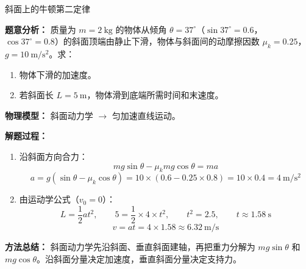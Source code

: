 \begin{examplebox}{斜面上的牛顿第二定律}

\textbf{题意分析：} 质量为 $m = 2\ \mathrm{kg}$ 的物体从倾角 $\theta = 37^\circ$（$\sin37^\circ = 0.6$，$\cos37^\circ = 0.8$）的斜面顶端由静止下滑，物体与斜面间的动摩擦因数 $\mu_k = 0.25$，$g = 10\ \mathrm{m/s^2}$。求：
\begin{enumerate}
  \item 物体下滑的加速度。
  \item 若斜面长 $L = 5\ \mathrm{m}$，物体滑到底端所需时间和末速度。
\end{enumerate}

\textbf{物理模型：} 斜面动力学 $\to$ 匀加速直线运动。

\begin{center}


\label{fig:example-newton-incline}
\end{center}

\textbf{解题过程：}

\begin{enumerate}
  \item 沿斜面方向合力：
  \[
  mg\sin\theta - \mu_k mg\cos\theta = ma
  \]
  \[
  a = g(\sin\theta - \mu_k\cos\theta) = 10 \times (0.6 - 0.25 \times 0.8) = 10 \times 0.4 = 4\ \mathrm{m/s^2}
  \]

  \item 由运动学公式（$v_0 = 0$）：
  \[
  L = \frac12 a t^2,\qquad 5 = \frac12 \times 4 \times t^2,\qquad t^2 = 2.5,\qquad t \approx 1.58\ \mathrm{s}
  \]
  \[
  v = a t = 4 \times 1.58 \approx 6.32\ \mathrm{m/s}
  \]
\end{enumerate}

\textbf{方法总结：} 斜面动力学先沿斜面、垂直斜面建轴，再把重力分解为 $mg\sin\theta$ 和 $mg\cos\theta$。沿斜面分量决定加速度，垂直斜面分量决定支持力。

\end{examplebox}

